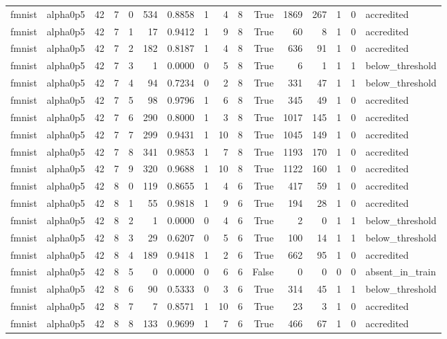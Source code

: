 \begin{tabular}{llrrrrrrrrrrrrrl}
fmnist & alpha0p5 & 42 & 7 & 0 & 534 & 0.8858 & 1 & 4 & 8 & True & 1869 & 267 & 1 & 0 & accredited \\
fmnist & alpha0p5 & 42 & 7 & 1 & 17 & 0.9412 & 1 & 9 & 8 & True & 60 & 8 & 1 & 0 & accredited \\
fmnist & alpha0p5 & 42 & 7 & 2 & 182 & 0.8187 & 1 & 4 & 8 & True & 636 & 91 & 1 & 0 & accredited \\
fmnist & alpha0p5 & 42 & 7 & 3 & 1 & 0.0000 & 0 & 5 & 8 & True & 6 & 1 & 1 & 1 & below\_threshold \\
fmnist & alpha0p5 & 42 & 7 & 4 & 94 & 0.7234 & 0 & 2 & 8 & True & 331 & 47 & 1 & 1 & below\_threshold \\
fmnist & alpha0p5 & 42 & 7 & 5 & 98 & 0.9796 & 1 & 6 & 8 & True & 345 & 49 & 1 & 0 & accredited \\
fmnist & alpha0p5 & 42 & 7 & 6 & 290 & 0.8000 & 1 & 3 & 8 & True & 1017 & 145 & 1 & 0 & accredited \\
fmnist & alpha0p5 & 42 & 7 & 7 & 299 & 0.9431 & 1 & 10 & 8 & True & 1045 & 149 & 1 & 0 & accredited \\
fmnist & alpha0p5 & 42 & 7 & 8 & 341 & 0.9853 & 1 & 7 & 8 & True & 1193 & 170 & 1 & 0 & accredited \\
fmnist & alpha0p5 & 42 & 7 & 9 & 320 & 0.9688 & 1 & 10 & 8 & True & 1122 & 160 & 1 & 0 & accredited \\
fmnist & alpha0p5 & 42 & 8 & 0 & 119 & 0.8655 & 1 & 4 & 6 & True & 417 & 59 & 1 & 0 & accredited \\
fmnist & alpha0p5 & 42 & 8 & 1 & 55 & 0.9818 & 1 & 9 & 6 & True & 194 & 28 & 1 & 0 & accredited \\
fmnist & alpha0p5 & 42 & 8 & 2 & 1 & 0.0000 & 0 & 4 & 6 & True & 2 & 0 & 1 & 1 & below\_threshold \\
fmnist & alpha0p5 & 42 & 8 & 3 & 29 & 0.6207 & 0 & 5 & 6 & True & 100 & 14 & 1 & 1 & below\_threshold \\
fmnist & alpha0p5 & 42 & 8 & 4 & 189 & 0.9418 & 1 & 2 & 6 & True & 662 & 95 & 1 & 0 & accredited \\
fmnist & alpha0p5 & 42 & 8 & 5 & 0 & 0.0000 & 0 & 6 & 6 & False & 0 & 0 & 0 & 0 & absent\_in\_train \\
fmnist & alpha0p5 & 42 & 8 & 6 & 90 & 0.5333 & 0 & 3 & 6 & True & 314 & 45 & 1 & 1 & below\_threshold \\
fmnist & alpha0p5 & 42 & 8 & 7 & 7 & 0.8571 & 1 & 10 & 6 & True & 23 & 3 & 1 & 0 & accredited \\
fmnist & alpha0p5 & 42 & 8 & 8 & 133 & 0.9699 & 1 & 7 & 6 & True & 466 & 67 & 1 & 0 & accredited \\

\end{tabular}
